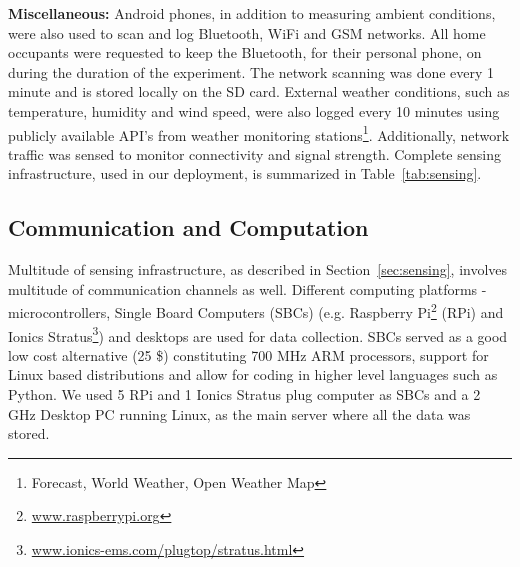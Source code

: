 \documentclass[10pt]{sensys-proc}
\newcommand{\secref}[1]{Section~\ref{#1}}
\newcommand{\tabref}[1]{Table~\ref{#1}}
\begin{document}
\noindent \textbf{Miscellaneous:} Android phones, in addition to measuring ambient conditions, were also used to scan and log Bluetooth, WiFi and GSM networks. All home occupants were requested to keep the Bluetooth, for their personal phone, on during the duration of the experiment. The network scanning was done every 1 minute and is stored locally on the SD card. External weather conditions, such as temperature, humidity and wind speed, were also logged every 10 minutes using publicly available API's from weather monitoring stations\footnote{Forecast, World Weather, Open Weather Map}.
Additionally, network traffic was sensed to monitor connectivity and signal strength. %
Complete sensing infrastructure, used in our deployment, is summarized in \tabref{tab:sensing}.


\subsection{Communication and Computation}
Multitude of sensing infrastructure, as described in \secref{sec:sensing}, involves multitude of communication channels as well. Different computing platforms - microcontrollers, Single Board Computers (SBCs) (e.g. Raspberry Pi\footnote{\url{www.raspberrypi.org}} (RPi) and Ionics Stratus\footnote{\url{www.ionics-ems.com/plugtop/stratus.html}}) and desktops are used for data collection.  
SBCs served as a good low cost alternative (25 \$) constituting 700 MHz ARM processors, support for Linux based distributions and allow for coding in higher level languages such as Python. %
We used 5 RPi and 1 Ionics Stratus plug computer as SBCs and a 2 GHz Desktop PC running Linux, as the main server where all the data was stored. %
\end{document}
